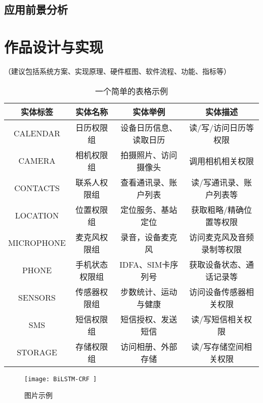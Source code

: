 \documentclass{cumcmthesis}
\numberwithin{equation}{section} %
\numberwithin{figure}{section} %
\numberwithin{table}{section} %
\begin{document}
\subsection{应用前景分析}

\newpage

\section{作品设计与实现}

（建议包括系统方案、实现原理、硬件框图、软件流程、功能、指标等）

\begin{table}[htbp]
	\centering
	\caption{一个简单的表格示例}
	\begin{tabular}{cccc}
		\toprule[1pt]
		\toprule[1pt]
		\textbf{实体标签} & \textbf{实体名称} & \textbf{实体举例} & \textbf{实体描述}\\
		\midrule
		\midrule
		CALENDAR & 日历权限组 & 设备日历信息、读取日历 & 读/写/访问日历等权限 \\
		\hline
		CAMERA & 相机权限组 & 拍摄照片、访问摄像头 & 调用相机相关权限 \\	
		\hline
		CONTACTS & 联系人权限组 & 查看通讯录、账户列表 & 读/写通讯录、账户列表等 \\
		\hline
		LOCATION & 位置权限组 & 定位服务、基站定位 & 获取粗略/精确位置等权限 \\
		\hline
		MICROPHONE & 麦克风权限组 & 录音，设备麦克风 & 访问麦克风及音频录制等权限 \\
		\hline
		PHONE & 手机状态权限组 & IDFA、SIM卡序列号 & 获取设备状态、通话记录等 \\
		\hline
		SENSORS & 传感器权限组 & 步数统计、运动与健康 & 访问设备传感器相关权限 \\
		\hline
		SMS & 短信权限组 & 短信授权、发送短信 & 读/写短信相关权限 \\
		\hline
		STORAGE & 存储权限组 & 访问相册、外部存储 & 读/写存储空间相关权限 \\
		\bottomrule[1pt]
		\bottomrule[1pt]
	\end{tabular}
	\label{tab:实体标签}%
\end{table}%

\begin{figure}[h]
	\centering
	\texttt{[image:  BiLSTM-CRF ]}
	\caption{ 图片示例 }
	\label{fig:BiLSTM-CRF}
\end{figure}
\end{document}
